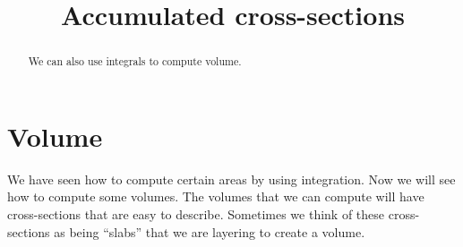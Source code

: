 \documentclass{ximera}
\title[Dig-In:]{Accumulated cross-sections}
\begin{document}
\begin{abstract}
  We can also use integrals to compute volume.
\end{abstract}
\maketitle

\section{Volume}

We have seen how to compute certain areas by using integration. Now we
will see how to compute some volumes.  The volumes that we can compute
will have cross-sections that are easy to describe. Sometimes we think
of these cross-sections as being ``slabs'' that we are layering to
create a volume.
\end{document}
